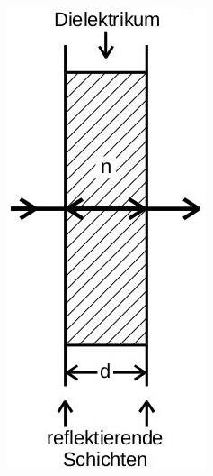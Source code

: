 \begin{figure}
    \centering
    \begin{subfigure}[c]{0.19\textwidth}
        \includegraphics[width=\textwidth]{filter.jpg}

\end{subfigure}
\end{figure}
